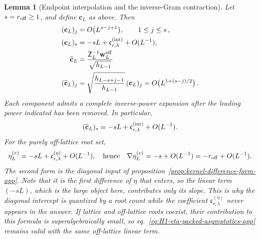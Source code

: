 \documentclass[a4paper,11pt]{article}
\newtheorem{lemma}[proposition]{Lemma}
\theoremstyle{definition}
\theoremstyle{remark}
\begin{document}
\begin{lemma}[Endpoint interpolation and the inverse-Gram contraction]
\label{lem:H1-eta-packed-app}
Let \(s=r_{\rm off}\ge1\), and define \(\mathbf c_L\) as above. Then 
\begin{equation}
\begin{aligned}
   (\mathbf c_L)_j
   &=O\bigl(L^{s-j+1}\bigr),
   \qquad 1\le j\le s\,,\\
   (\mathbf c_L)_s
   &=-sL+\mathfrak c_{r,\lambda}^{({\rm int})}+O(L^{-1}),\\
   \widehat{\mathbf c}_L
   &=
   \frac{\mathsf Z_L^{-1}\mathbf w_L^{\rm off}}
   {\sqrt{h_{L-1}}}\\   (\widehat{\mathbf c}_L)_j
   &=
   \sqrt{\frac{h_{L-s+j-1}}{h_{L-1}}}\,
   (\mathbf c_L)_j
   =
   O\bigl(L^{1+(s-j)/2}\bigr)\,.
\end{aligned}
   \label{eq:H1-eta-normalized-packed-app}
\end{equation}
Each component admits a complete inverse-power expansion after the
leading power indicated has been removed. In particular,
\begin{equation}
   (\widehat{\mathbf c}_L)_s
   =-sL+\mathfrak c_{r,\lambda}^{({\rm int})}+O(L^{-1}).
   \label{eq:H1-eta-endpoint-refined-app}
\end{equation}
For the purely off-lattice root set,
\begin{equation}
   \eta_L^{(r)}
   =-sL+\mathfrak c_{r,\lambda}^{(\eta)}+O(L^{-1}),
   \quad\text{hence}\quad
   \nabla\eta_L^{(r)}=-s+O(L^{-1})=-r_{\rm off}+O(L^{-1}).
   \label{eq:H1-eta-packed-asymptotics-app}
\end{equation}
The second form is the diagonal input of
proposition~\ref{prop:kernel-difference-form-app}. Note that it is the \emph{first} difference of
$\eta$ that enters, so the linear term $(-sL)$, which is the large object here, contributes
only its slope. This is why the diagonal intercept is quantized by a root count while the
coefficient $\mathfrak c_{r,\lambda}^{(\eta)}$ never appears in the answer.
If lattice and off-lattice roots coexist, their contribution to this
formula is superalgebraically small, so
eq.~\eqref{eq:H1-eta-packed-asymptotics-app} remains valid with the same
off-lattice linear term.
\end{lemma}
\end{document}
